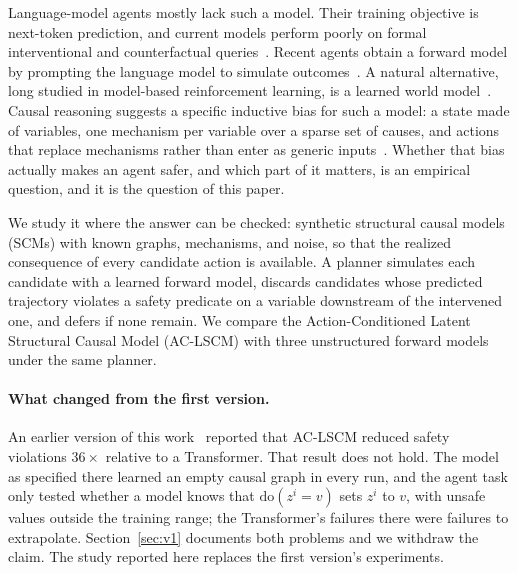 \documentclass[11pt]{article}
\newcommand{\doop}{\mathrm{do}}
\begin{document}
Language-model agents mostly lack such a model. Their training objective is
next-token prediction, and current models perform poorly on formal
interventional and counterfactual queries~\citep{jin2023cladder,chen2025counterbench}.
Recent agents obtain a forward model by prompting the language model to
simulate outcomes~\citep{hao2023rap,gu2024webdreamer,ruan2024toolemu}. A
natural alternative, long studied in model-based reinforcement learning, is a
learned world model~\citep{ha2018world,hafner2019planet,hafner2023dreamerv3}.
Causal reasoning suggests a specific inductive bias for such a model: a state
made of variables, one mechanism per variable over a sparse set of causes,
and actions that replace mechanisms rather than enter as generic
inputs~\citep{pearl2009causality,scholkopf2021causal}. Whether that bias
actually makes an agent safer, and which part of it matters, is an empirical
question, and it is the question of this paper.

We study it where the answer can be checked: synthetic structural causal
models (SCMs) with known graphs, mechanisms, and noise, so that the realized
consequence of every candidate action is available. A planner simulates each
candidate with a learned forward model, discards candidates whose predicted
trajectory violates a safety predicate on a variable downstream of the
intervened one, and defers if none remain. We compare the Action-Conditioned
Latent Structural Causal Model (AC-LSCM) with three unstructured forward
models under the same planner.

\paragraph{What changed from the first version.}
An earlier version of this work~\citep{madapathi2026zenodo} reported that
AC-LSCM reduced safety violations $36\times$ relative to a Transformer. That
result does not hold. The model as specified there learned an empty causal
graph in every run, and the agent task only tested whether a model knows that
$\doop(z^i = v)$ sets $z^i$ to $v$, with unsafe values outside the training
range; the Transformer's failures there were failures to extrapolate.
Section~\ref{sec:v1} documents both problems and we withdraw the claim. The
study reported here replaces the first version's experiments.
\end{document}
